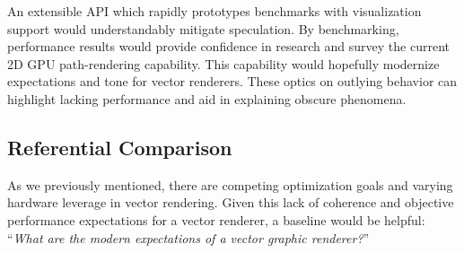 An extensible API which rapidly prototypes benchmarks with visualization support would understandably mitigate speculation. By benchmarking, performance results would provide confidence in research and survey the current 2D GPU path-rendering capability. This capability would hopefully modernize expectations and tone for vector renderers. These optics on outlying behavior can highlight lacking performance and aid in explaining obscure phenomena.

\subsection{Referential Comparison}\label{sec:referential_comparison}
As we previously mentioned, there are competing optimization goals and varying hardware leverage in vector rendering. Given this lack of coherence and objective performance expectations for a vector renderer, a baseline would be helpful: ``\textit{What \emph{are} the modern expectations of a vector graphic renderer?}''